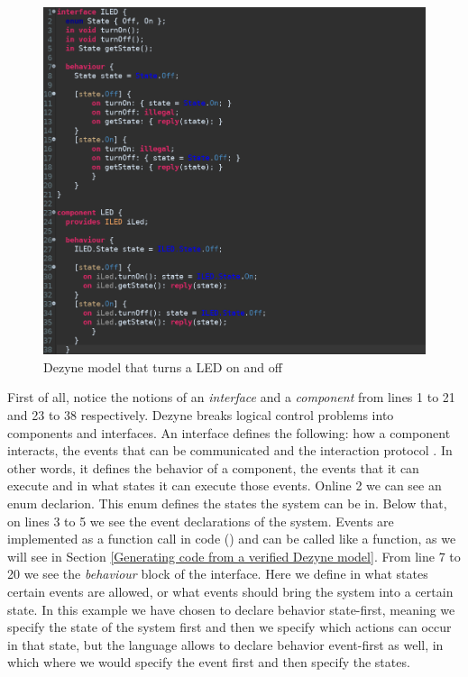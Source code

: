 \documentclass[12pt]{scrreprt}
\begin{document}
\begin{figure}[H]
    \centering
    \includegraphics[width=\textwidth]{Figures/theoretical_background/led_example.png}
    \caption{Dezyne model that turns a LED on and off}
    \label{fig:theoretical_background_dezyne_model}
\end{figure}

First of all, notice the notions of an \textit{interface} and a \textit{component} from lines 1 to 21 and 23 to 38 respectively. Dezyne breaks logical control problems into components and interfaces. An interface defines the following: how a component interacts, the events that can be communicated and the interaction protocol \cite{dzndoc}. In other words, it defines the behavior of a component, the events that it can execute and in what states it can execute those events. Online 2 we can see an enum declarion. This enum defines the states the system can be in. Below that, on lines 3 to 5 we see the event declarations of the system. Events are implemented as a function call in code (\cite{dzngloss}) and can be called like a function, as we will see in Section \ref{Generating code from a verified Dezyne model}. From line 7 to 20 we see the \textit{behaviour} block of the interface. Here we define in what states certain events are allowed, or what events should bring the system into a certain state. In this example we have chosen to declare behavior state-first, meaning we specify the state of the system first and then we specify which actions can occur in that state, but the language allows to declare behavior event-first as well, in which where we would specify the event first and then specify the states.
\end{document}
